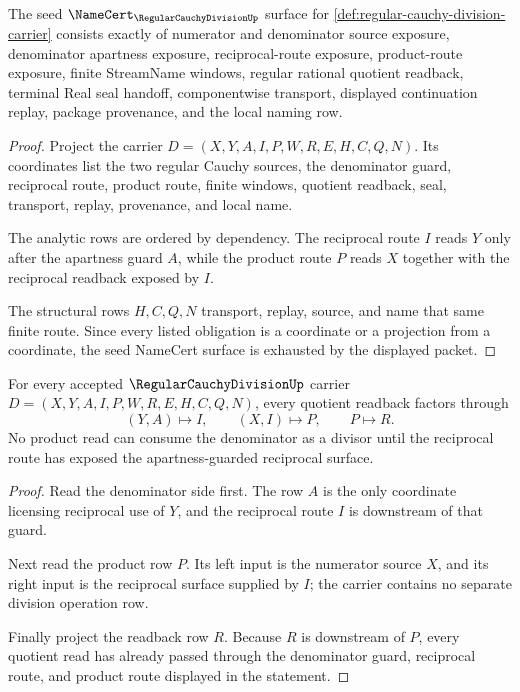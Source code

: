 \begin{theorem}
\label{thm:regular-cauchy-division-namecert-obligations}
The seed $\NameCert_{\RegularCauchyDivisionUp}$ surface for \autoref{def:regular-cauchy-division-carrier} consists exactly of numerator and denominator source exposure, denominator apartness exposure, reciprocal-route exposure, product-route exposure, finite StreamName windows, regular rational quotient readback, terminal Real seal handoff, componentwise transport, displayed continuation replay, package provenance, and the local naming row.
\end{theorem}
\begin{proof}
Project the carrier $D=(X,Y,A,I,P,W,R,E,H,C,Q,N)$. Its coordinates list the two regular Cauchy sources, the denominator guard, reciprocal route, product route, finite windows, quotient readback, seal, transport, replay, provenance, and local name.

The analytic rows are ordered by dependency. The reciprocal route $I$ reads $Y$ only after the apartness guard $A$, while the product route $P$ reads $X$ together with the reciprocal readback exposed by $I$.

The structural rows $H,C,Q,N$ transport, replay, source, and name that same finite route. Since every listed obligation is a coordinate or a projection from a coordinate, the seed NameCert surface is exhausted by the displayed packet.
\end{proof}

\begin{theorem}
\label{thm:regular-cauchy-division-reciprocal-product-handoff}
For every accepted $\RegularCauchyDivisionUp$ carrier $D=(X,Y,A,I,P,W,R,E,H,C,Q,N)$, every quotient readback factors through
$$
(Y,A)\longmapsto I,\qquad (X,I)\longmapsto P,\qquad P\longmapsto R.
$$
No product read can consume the denominator as a divisor until the reciprocal route has exposed the apartness-guarded reciprocal surface.
\end{theorem}
\begin{proof}
Read the denominator side first. The row $A$ is the only coordinate licensing reciprocal use of $Y$, and the reciprocal route $I$ is downstream of that guard.

Next read the product row $P$. Its left input is the numerator source $X$, and its right input is the reciprocal surface supplied by $I$; the carrier contains no separate division operation row.

Finally project the readback row $R$. Because $R$ is downstream of $P$, every quotient read has already passed through the denominator guard, reciprocal route, and product route displayed in the statement.
\end{proof}

